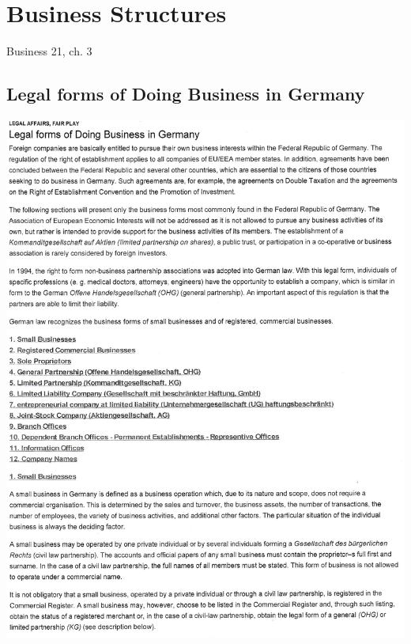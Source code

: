 \section{Business Structures}
Business 21, ch. 3
\subsection{Legal forms of Doing Business in Germany}
\includegraphics[scale=.85]{handouts/Eng201.jpg}

